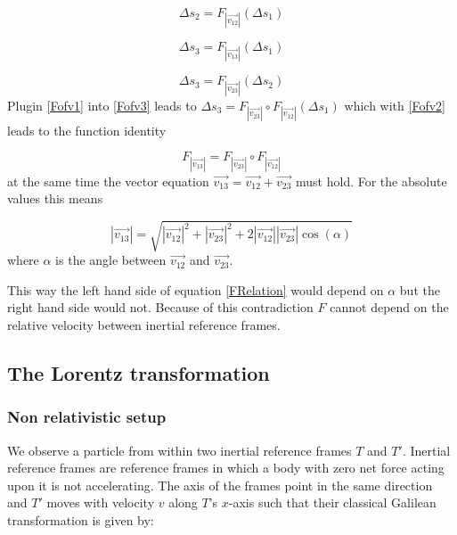 \documentclass{article}
\begin{document}
\begin{equation}\label{Fofv1}
\Delta s_2 = F_{|\vec{v_{12}}|}(\Delta s_1)
\end{equation}

\begin{equation} \label{Fofv2}
\Delta s_3 = F_{|\vec{v_{13}}|}(\Delta s_1)
\end{equation}

\begin{equation} \label{Fofv3}
\Delta s_3 = F_{|\vec{v_{23}}|}(\Delta s_2)
\end{equation}
Plugin \ref{Fofv1} into \ref{Fofv3} leads to $\Delta s_3 = F_{|\vec{v_{23}}|} \circ F_{|\vec{v_{12}}|} (\Delta s_1)$ which with \ref{Fofv2} leads to the function identity

\begin{equation} \label{FRelation}
F_{|\vec{v_{13}}|} = F_{|\vec{v_{23}}|} \circ F_{|\vec{v_{12}}|}
\end{equation}
at the same time the vector equation $\vec{v_{13}} = \vec{v_{12}} + \vec{v_{23}}$ must hold. For the absolute values this means

\begin{equation}
    |\vec{v_{13}}| = \sqrt{|\vec{v_{12}}|^2 + |\vec{v_{23}}|^2 + 2 |\vec{v_{12}}||\vec{v_{23}}| \cos(\alpha)}
\end{equation}
where $\alpha$ is the angle between $\vec{v_{12}}$ and $\vec{v_{23}}$.

This way the left hand side of equation \ref{FRelation} would depend on $\alpha$ but the right hand side would not. Because of this contradiction $F$ cannot depend on the relative velocity between inertial reference frames.




\subsection{The Lorentz transformation} \label{sectionLorentzTransformation}

\subsubsection{Non relativistic setup} \label{setup}
We observe a particle from within two inertial reference frames $T$ and $T'$.
Inertial reference frames are reference frames in which a body with zero net force acting upon it is not accelerating.
The axis of the frames point in the same direction and $T'$ moves with velocity $v$ along $T$'s $x$-axis such that their classical Galilean transformation is given by:
\end{document}
